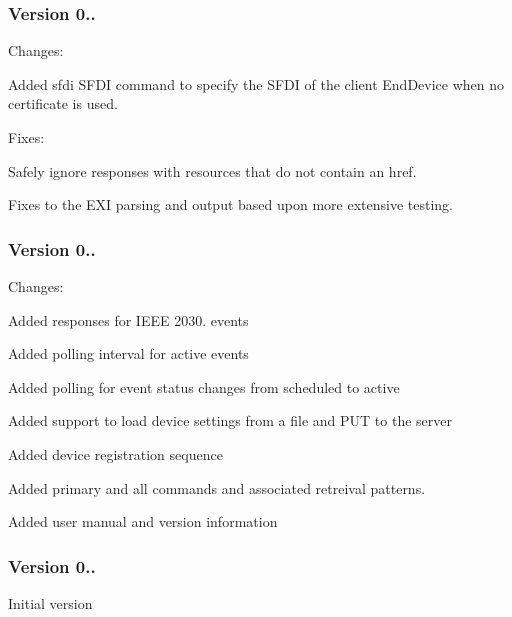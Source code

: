 \subsubsection*{Version 0..}

Changes\+:


\begin{DoxyItemize}
\item Added {\ttfamily sfdi S\+F\+DI} command to specify the S\+F\+DI of the client End\+Device when no certificate is used.
\end{DoxyItemize}

Fixes\+:


\begin{DoxyItemize}
\item Safely ignore responses with resources that do not contain an href.
\item Fixes to the E\+XI parsing and output based upon more extensive testing.
\end{DoxyItemize}

\subsubsection*{Version 0..}

Changes\+:


\begin{DoxyItemize}
\item Added responses for I\+E\+EE 2030. events
\item Added polling interval for active events
\item Added polling for event status changes from scheduled to active
\item Added support to load device settings from a file and P\+UT to the server
\item Added device registration sequence
\item Added {\ttfamily primary} and {\ttfamily all} commands and associated retreival patterns.
\item Added user manual and version information
\end{DoxyItemize}

\subsubsection*{Version 0..}

Initial version 